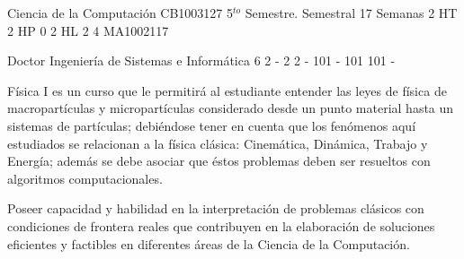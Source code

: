 \documentclass[a4paper,8pt]{article}
\begin{document}
\setNombreProfesor{}
\setGradoProfesorAbreviado{}
\sylabusHeader

\academicaTable
{Ciencia de la Computación} %
{CB1003127} %
{5$^{to}$ Semestre.} %
{Semestral} %
{17 Semanas} %
{2 HT} %
{2 HP} %
{0} %
{2 HL}  %
{2} %
{4} %
{MA1002117} %

\administrativaTable
{Doctor} %
{Ingeniería de Sistemas e Informática} %
{6} %
{2} %
{-} %
{2} %
{2} %
{-} %
{101} %
{-} %
{101} %
{101} %
{-} %


\begin{fundamentacion}
Física I es un curso que le permitirá al estudiante entender
las leyes de física de macropartículas y micropartículas considerado desde un
punto material hasta un sistemas de partículas; debiéndose tener en cuenta que los
fenómenos aquí estudiados se relacionan a la física clásica: Cinemática, Dinámica, Trabajo y Energía; 
además se debe asociar que éstos problemas deben ser resueltos con algoritmos computacionales.

Poseer capacidad y habilidad en la interpretación de problemas clásicos
con condiciones de frontera reales que contribuyen en la elaboración de soluciones eficientes
y factibles en diferentes áreas de la Ciencia de la Computación.

\end{fundamentacion}

\begin{sumilla}
\item 
\item 
\item 
\item 
\item 
\item 

\end{sumilla}

\begin{competenciasAsignatura}
\item {}
\item {}
\item {}

\end{competenciasAsignatura}
\end{document}

